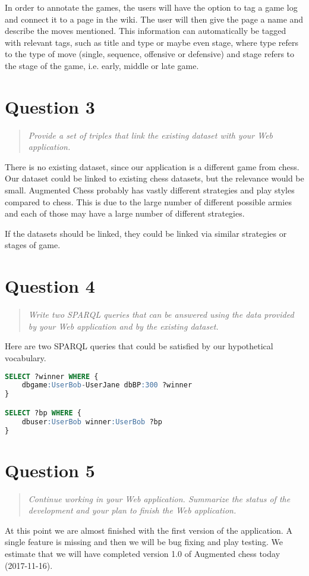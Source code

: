 \documentclass[10pt,a4paper]{report}
\begin{document}
In order to annotate the games, the users will have the option to tag a game log and connect it to a page in the wiki. The user will then give the page a name and describe the moves mentioned. This information can automatically be tagged with relevant tags, such as title and type or maybe even stage, where type refers to the type of move (single, sequence, offensive or defensive) and stage refers to the stage of the game, i.e. early, middle or late game.

\section{Question 3}
\begin{quote}
\textit{Provide a set of triples that link the existing dataset with your Web application.}
\end{quote}

There is no existing dataset, since our application is a different game from chess. Our dataset could be linked to existing chess datasets, but the relevance would be small. Augmented Chess probably has vastly different strategies and play styles compared to chess. This is due to the large number of different possible armies and each of those may have a large number of different strategies.

If the datasets should be linked, they could be linked via similar strategies or stages of game.

\section{Question 4}
\begin{quote}
\textit{Write two SPARQL queries that can be answered using the data provided by your Web application and by the existing dataset.}
\end{quote}

Here are two SPARQL queries that could be satisfied by our hypothetical vocabulary.

\begin{lstlisting}[language=sql]
SELECT ?winner WHERE {
	dbgame:UserBob-UserJane dbBP:300 ?winner 
}

SELECT ?bp WHERE {
	dbuser:UserBob winner:UserBob ?bp
}
\end{lstlisting}

\section{Question 5}
\begin{quote}
\textit{Continue working in your Web application. Summarize the status of the development and your plan to finish the Web application.}
\end{quote}

At this point we are almost finished with the first version of the application. A single feature is missing and then we will be bug fixing and play testing. We estimate that we will have completed version 1.0 of Augmented chess today (2017-11-16).
\end{document}
